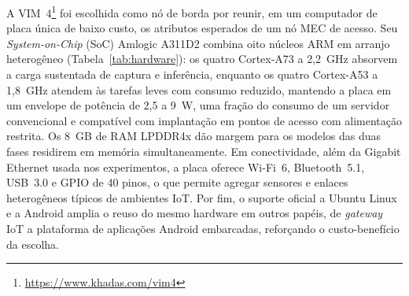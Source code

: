 \documentclass[12pt]{article}
\begin{document}
A VIM~4\footnote{\url{https://www.khadas.com/vim4}} foi escolhida como nó de
borda por reunir, em um computador de placa única de baixo custo, os atributos
esperados de um nó MEC de acesso. Seu \textit{System-on-Chip} (SoC) Amlogic
A311D2 combina oito núcleos ARM em arranjo heterogêneo
(Tabela~\ref{tab:hardware}): os quatro Cortex-A73 a 2,2~GHz absorvem a carga
sustentada de captura e inferência, enquanto os quatro Cortex-A53 a 1,8~GHz
atendem às tarefas leves com consumo reduzido, mantendo a placa em um envelope
de potência de 2,5 a 9~W, uma fração do consumo de um servidor convencional e
compatível com implantação em pontos de acesso com alimentação restrita. Os
8~GB de RAM LPDDR4x dão margem para os modelos das duas fases residirem em
memória simultaneamente. Em conectividade, além da Gigabit Ethernet usada nos
experimentos, a placa oferece Wi-Fi~6, Bluetooth~5.1, USB~3.0 e GPIO de 40
pinos, o que permite agregar sensores e enlaces heterogêneos típicos de
ambientes IoT. Por fim, o suporte oficial a Ubuntu Linux e a Android amplia o
reuso do mesmo hardware em outros papéis, de \textit{gateway} IoT a plataforma
de aplicações Android embarcadas, reforçando o custo-benefício da escolha.
\end{document}
